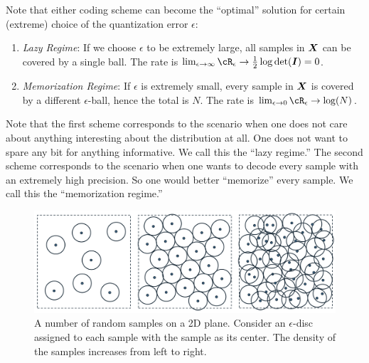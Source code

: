 \documentclass[../../book-main.tex]{subfiles}
\begin{document}
Note that either coding scheme can become the ``optimal'' solution for certain (extreme) choice of the quantization error $\epsilon$:
\begin{enumerate}
	\item {\em Lazy Regime}: If we choose $\epsilon$ to be extremely large, all samples in $\bm{X}$ can be covered by a single ball. The rate is  $\lim_{\epsilon \rightarrow \infty} \cR_\epsilon \rightarrow \frac{1}{2}\log\det (\boldsymbol{I}) = 0$.
	\item {\em Memorization Regime}: If $\epsilon$ is extremely small, every sample in $\bm{X}$  is covered by a different $\epsilon$-ball, hence the total is $N$. The rate is $\lim_{\epsilon \rightarrow 0} \cR_\epsilon \rightarrow \log(N)$.
\end{enumerate}
Note that the first scheme corresponds to the scenario when one does not care about anything interesting about the distribution at all. One does not want to spare any bit for anything informative. We call this the ``lazy regime.'' The second scheme corresponds to the scenario when one wants to decode every sample with an extremely high precision. So one would better ``memorize'' every sample. We call this the ``memorization regime.''
\begin{figure}
	\centering
	\includegraphics[width=0.9\linewidth]{chapters/chapter3/figs/circle-packing.png}
	\caption{A number of random samples on a 2D plane. Consider an $\epsilon$-disc assigned to each sample with the sample as its center. The density of the samples increases from left to right.}
	\label{fig:circle-packing}
\end{figure}
\end{document}
